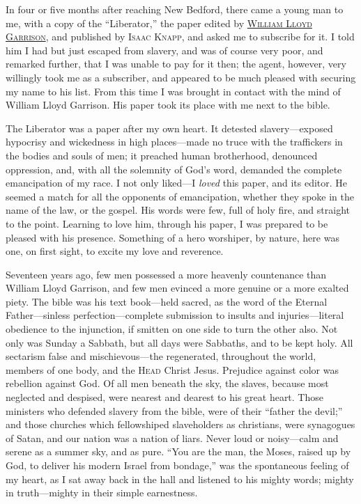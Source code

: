 In four or five months after reaching New Bedford, there came a young
man to me, with a copy of the ``Liberator,'' the paper edited by
\href{/wiki/Author:William_Lloyd_Garrison}{\textsc{William Lloyd
Garrison}}, and published by \textsc{Isaac Knapp}, and asked me to
subscribe for it. I told him I had but just escaped from slavery, and
was of course very poor, and remarked further, that I was unable to pay
for it then; the agent, however, very willingly took me as a subscriber,
and appeared to be much pleased with securing my name to his list. From
this time I was brought in contact with the mind of William Lloyd
Garrison. His paper took its place with me next to the bible.

The Liberator was a paper after my own heart. It detested
slavery---exposed hypocrisy and wickedness in high places---made no
truce with the traffickers in the bodies and souls of men; it preached
human brotherhood, denounced oppression, and, with all the solemnity of
God's word, demanded the complete emancipation of my race. I not only
liked---I \emph{loved} this paper, and its editor. He seemed a match for
all the opponents of emancipation, whether they spoke in the name of the
law, or the gospel. His words were few, full of holy fire, and straight
to the point. Learning to love him, through his paper, I was prepared to
be pleased with his presence. Something of a hero worshiper, by nature,
here was one, on first sight, to excite my love and reverence.

Seventeen years ago, few men possessed a more {}heavenly countenance
than William Lloyd Garrison, and few men evinced a more genuine or a
more exalted piety. The bible was his text book---held sacred, as the
word of the Eternal Father---sinless perfection---complete submission to
insults and injuries---literal obedience to the injunction, if smitten
on one side to turn the other also. Not only was Sunday a Sabbath, but
all days were Sabbaths, and to be kept holy. All sectarism false and
mischievous---the regenerated, throughout the world, members of one
body, and the \textsc{Head} Christ Jesus. Prejudice against color was
rebellion against God. Of all men beneath the sky, the slaves, because
most neglected and despised, were nearest and dearest to his great
heart. Those ministers who defended slavery from the bible, were of
their ``father the devil;'' and those churches which fellowshiped
slaveholders as christians, were synagogues of Satan, and our nation was
a nation of liars. Never loud or noisy---calm and serene as a summer
sky, and as pure. ``You are the man, the Moses, raised up by God, to
deliver his modern Israel from bondage,'' was the spontaneous feeling of
my heart, as I sat away back in the hall and listened to his mighty
words; mighty in truth---mighty in their simple earnestness.

